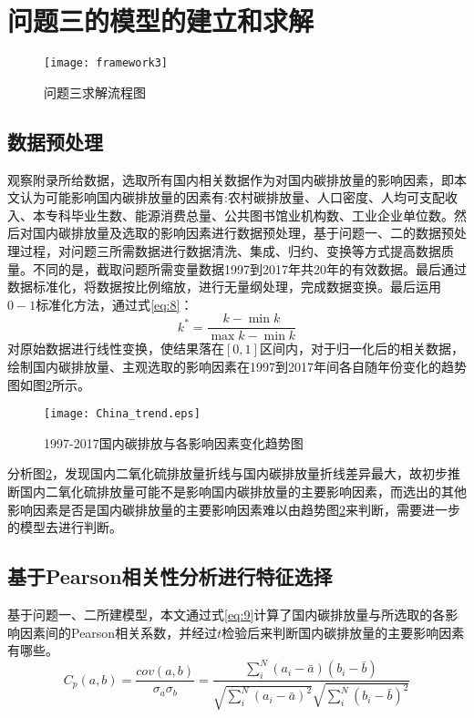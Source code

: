 \documentclass[withoutpreface,bwprint]{cumcmthesis}
\begin{document}
\newpage
\section{问题三的模型的建立和求解}
\begin{figure}[htbp]
	\centering
	\texttt{[image: framework3]}
	\caption{问题三求解流程图}
	\label{fig:framework3}
\end{figure}


\subsection{数据预处理}
	观察附录所给数据，选取所有国内相关数据作为对国内碳排放量的影响因素，即本文认为可能影响国内碳排放量的因素有:农村碳排放量、人口密度、人均可支配收入、本专科毕业生数、能源消费总量、公共图书馆业机构数、工业企业单位数。然后对国内碳排放量及选取的影响因素进行数据预处理，基于问题一、二的数据预处理过程，对问题三所需数据进行数据清洗、集成、归约、变换等方式提高数据质量。不同的是，截取问题所需变量数据1997到2017年共20年的有效数据。最后通过数据标准化，将数据按比例缩放，进行无量纲处理，完成数据变换。最后运用$0-1$标准化方法，通过式\eqref{eq:8}：
	\begin{equation}
		\label{eq:8}
		{{k}^{*}}=\frac{k-\min{k}}{\max{k}-\min{k}}
	\end{equation}
	对原始数据进行线性变换，使结果落在$[0,1]$区间内，对于归一化后的相关数据，绘制国内碳排放量、主观选取的影响因素在1997到2017年间各自随年份变化的趋势图如图\ref{fig:chinatrend}所示。
	
\begin{figure}[htb]
	\centering
	\texttt{[image: China\_trend.eps]}
	\caption{1997-2017国内碳排放与各影响因素变化趋势图}
	\label{fig:chinatrend}
\end{figure}

	分析图\ref{fig:chinatrend}，发现国内二氧化硫排放量折线与国内碳排放量折线差异最大，故初步推断国内二氧化硫排放量可能不是影响国内碳排放量的主要影响因素，而选出的其他影响因素是否是国内碳排放量的主要影响因素难以由趋势图\ref{fig:chinatrend}来判断，需要进一步的模型去进行判断。
	
\subsection{基于Pearson相关性分析进行特征选择}
基于问题一、二所建模型，本文通过式\eqref{eq:9}计算了国内碳排放量与所选取的各影响因素间的Pearson相关系数，并经过$t$检验后来判断国内碳排放量的主要影响因素有哪些。
\begin{equation}
	\label{eq:9}
	{{C}_{p}}(a,b)=\frac{cov(a,b)}{{{\sigma }_{a}}{{\sigma }_{b}}}=\frac{\sum_{i}^{N}{({{a}_{i}}-\bar{a})({{b}_{i}}-\bar{b})}}{\sqrt{\sum_{i}^{N}{{{({{a}_{i}}-\bar{a})}^{2}}}}\sqrt{\sum_{i}^{N}{{{({{b}_{i}}-\bar{b})}^{2}}}}}
\end{equation}
\end{document}
